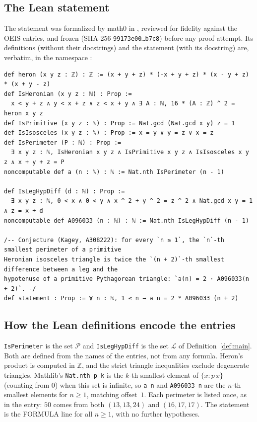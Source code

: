 \documentclass[11pt]{amsart}
\theoremstyle{plain}
\theoremstyle{definition}
\newcommand{\code}[1]{\texttt{#1}}
\newcommand{\Z}{\mathbb{Z}}
\newcommand{\Per}{\mathcal{P}}
\newcommand{\Leg}{\mathcal{L}}
\begin{document}
\subsection*{The Lean statement}
The statement was formalized by math0 in , reviewed for fidelity against the OEIS entries, and frozen (SHA-256 \texttt{99173e00\ldots b7c8}) before any proof attempt. Its definitions (without their docstrings) and the statement (with its docstring) are, verbatim, in the namespace :
\begin{lstlisting}[basicstyle=\ttfamily\scriptsize]
def heron (x y z : ℤ) : ℤ := (x + y + z) * (-x + y + z) * (x - y + z) * (x + y - z)
def IsHeronian (x y z : ℕ) : Prop :=
  x < y + z ∧ y < x + z ∧ z < x + y ∧ ∃ A : ℕ, 16 * (A : ℤ) ^ 2 = heron x y z
def IsPrimitive (x y z : ℕ) : Prop := Nat.gcd (Nat.gcd x y) z = 1
def IsIsosceles (x y z : ℕ) : Prop := x = y ∨ y = z ∨ x = z
def IsPerimeter (P : ℕ) : Prop :=
  ∃ x y z : ℕ, IsHeronian x y z ∧ IsPrimitive x y z ∧ IsIsosceles x y z ∧ x + y + z = P
noncomputable def a (n : ℕ) : ℕ := Nat.nth IsPerimeter (n - 1)

def IsLegHypDiff (d : ℕ) : Prop :=
  ∃ x y z : ℕ, 0 < x ∧ 0 < y ∧ x ^ 2 + y ^ 2 = z ^ 2 ∧ Nat.gcd x y = 1 ∧ z = x + d
noncomputable def A096033 (n : ℕ) : ℕ := Nat.nth IsLegHypDiff (n - 1)

/-- Conjecture (Kagey, A308222): for every `n ≥ 1`, the `n`-th smallest perimeter of a primitive
Heronian isosceles triangle is twice the `(n + 2)`-th smallest difference between a leg and the
hypotenuse of a primitive Pythagorean triangle: `a(n) = 2 · A096033(n + 2)`. -/
def statement : Prop := ∀ n : ℕ, 1 ≤ n → a n = 2 * A096033 (n + 2)
\end{lstlisting}

\subsection*{How the Lean definitions encode the entries}
\code{IsPerimeter} is the set $\Per$ and \code{IsLegHypDiff} is the set $\Leg$ of Definition~\ref{def:main}. Both are defined from the names of the entries, not from any formula. Heron's product is computed in $\Z$, and the strict triangle inequalities exclude degenerate triangles. Mathlib's \code{Nat.nth p k} is the $k$-th smallest element of $\{x: p\,x\}$ (counting from $0$) when this set is infinite, so \code{a n} and \code{A096033 n} are the $n$-th smallest elements for $n\ge1$, matching offset~$1$. Each perimeter is listed once, as in the entry: $50$ comes from both $(13,13,24)$ and $(16,17,17)$. The statement is the FORMULA line for all $n\ge1$, with no further hypotheses.
\end{document}
